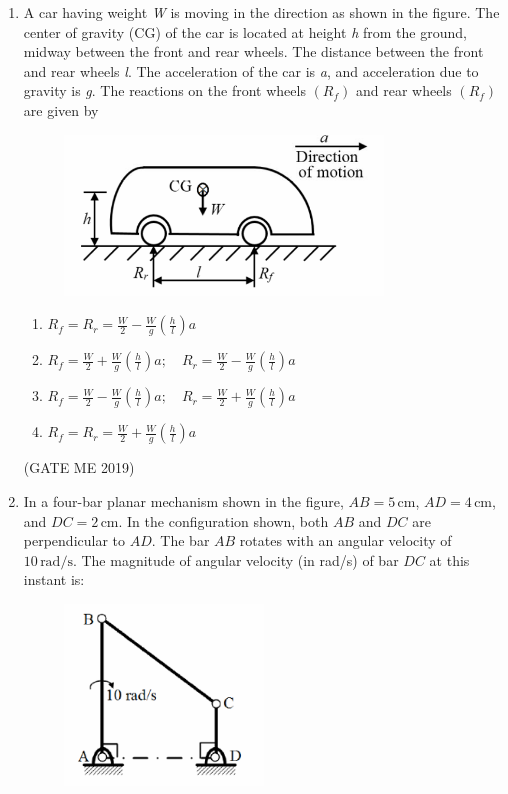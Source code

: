 \documentclass[journal]{IEEEtran}
\begin{document}
\begin{enumerate}
\item A car having weight \textit{W} is moving in the direction as shown in the figure. The center of gravity (CG) of the car is located at height \textit{h} from the ground, midway between the front and rear wheels. The distance between the front and rear wheels \textit{l}. The acceleration of the car is \textit{a}, and acceleration due to gravity is \textit{g}. The reactions on the front wheels $(R_f)$ and rear wheels $(R_f)$ are given by
\begin{figure}[H]
\centering
\includegraphics[width=0.8\textwidth]{Fig 8.png}
\caption{}
\label{fig:question29}
\end{figure}
\begin{enumerate}
\item $ R_f = R_r = \frac{W}{2} - \frac{W}{g} \left( \frac{h}{l} \right) a $ 
\item $ R_f = \frac{W}{2} + \frac{W}{g} \left( \frac{h}{l} \right) a ;\quad R_r = \frac{W}{2} - \frac{W}{g} \left( \frac{h}{l} \right) a $ 
\item $ R_f = \frac{W}{2} - \frac{W}{g} \left( \frac{h}{l} \right) a ;\quad R_r = \frac{W}{2} + \frac{W}{g} \left( \frac{h}{l} \right) a $ 
\item $ R_f = R_r = \frac{W}{2} + \frac{W}{g} \left( \frac{h}{l} \right) a $ 
\end{enumerate}
\hfill (GATE ME 2019)

\item In a four-bar planar mechanism shown in the figure, $ AB = 5\, \text{cm} $, $ AD = 4\, \text{cm} $, and $ DC = 2\, \text{cm} $. In the configuration shown, both $ AB $ and $ DC $ are perpendicular to $ AD $. The bar $ AB $ rotates with an angular velocity of $ 10\, \text{rad/s} $. The magnitude of angular velocity (in rad/s) of bar $ DC $ at this instant is:

\begin{figure}[H]
\centering
\includegraphics[width=0.5\textwidth]{Fig 9.png}
\caption{}
\label{fig:question30}
\end{figure}


\end{enumerate}
\end{document}
